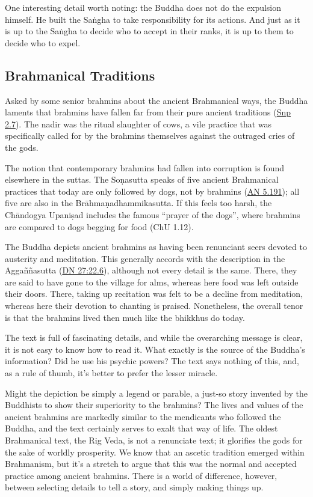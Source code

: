 \documentclass[12pt,openany]{book}%
\begin{document}
One interesting detail worth noting: the Buddha does not do the expulsion himself. He built the \textsanskrit{Saṅgha} to take responsibility for its actions. And just as it is up to the \textsanskrit{Saṅgha} to decide who to accept in their ranks, it is up to them to decide who to expel.

\subsection*{Brahmanical Traditions}

Asked by some senior brahmins about the ancient Brahmanical ways, the Buddha laments that brahmins have fallen far from their pure ancient traditions (\href{https://suttacentral.net/snp2.7/en/sujato}{Snp 2.7}). The nadir was the ritual slaughter of cows, a vile practice that was specifically called for by the brahmins themselves against the outraged cries of the gods.

The notion that contemporary brahmins had fallen into corruption is found elsewhere in the suttas. The \textsanskrit{Soṇasutta} speaks of five ancient Brahmanical practices that today are only followed by dogs, not by brahmins (\href{https://suttacentral.net/an5.191/en/sujato}{AN 5.191}); all five are also in the \textsanskrit{Brāhmaṇadhammikasutta}. If this feels too harsh, the \textsanskrit{Chāndogya} \textsanskrit{Upaniṣad} includes the famous “prayer of the dogs”, where brahmins are compared to dogs begging for food (ChU 1.12).

The Buddha depicts ancient brahmins as having been renunciant seers devoted to austerity and meditation. This generally accords with the description in the \textsanskrit{Aggaññasutta} (\href{https://suttacentral.net/dn27/en/sujato\#22.6}{DN 27:22.6}), although not every detail is the same. There, they are said to have gone to the village for alms, whereas here food was left outside their doors. There, taking up recitation was felt to be a decline from meditation, whereas here their devotion to chanting is praised. Nonetheless, the overall tenor is that the brahmins lived then much like the bhikkhus do today.

The text is full of fascinating details, and while the overarching message is clear, it is not easy to know how to read it. What exactly is the source of the Buddha’s information? Did he use his psychic powers? The text says nothing of this, and, as a rule of thumb, it’s better to prefer the lesser miracle.

Might the depiction be simply a legend or parable, a just-so story invented by the Buddhists to show their superiority to the brahmins? The lives and values of the ancient brahmins are markedly similar to the mendicants who followed the Buddha, and the text certainly serves to exalt that way of life. The oldest Brahmanical text, the Rig Veda, is not a renunciate text; it glorifies the gods for the sake of worldly prosperity. We know that an ascetic tradition emerged within Brahmanism, but it’s a stretch to argue that this was the normal and accepted practice among ancient brahmins. There is a world of difference, however, between selecting details to tell a story, and simply making things up.
\end{document}
